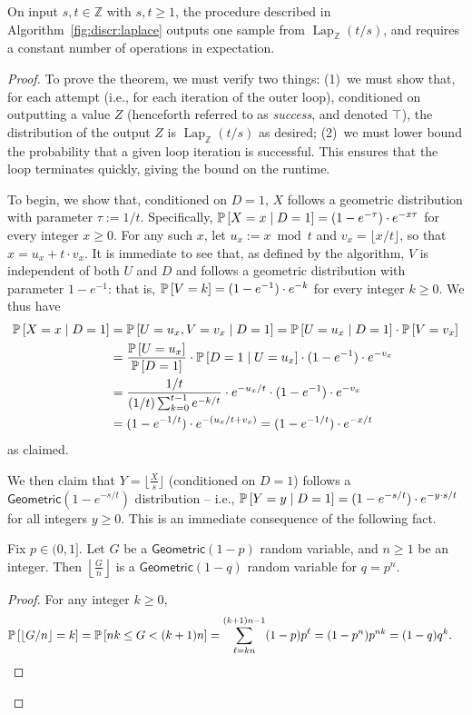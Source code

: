\documentclass{jpcfinal} %
\newcommand{\discL}{\operatorname{Lap}_{\Z}} \newcommand{\discN}{\mathcal{N}_{\Z}}
\newcommand{\pr}[2]{{\ifx&#1& \mathbb{P} \else
\underset{#1}{\mathbb{P}} \fi \left[#2\right]}}
\newcommand{\eqdef}{:=}
\newcommand{\Z}{\mathbb{Z}}
\begin{document}
\begin{prop}
  \label{prop:sampling:discr:laplace}
  On input $s,t \in \Z$ with $s,t\ge1$, the procedure described in Algorithm~\ref{fig:discr:laplace} outputs one sample from $\discL(t/s)$, and requires a constant number of operations in expectation.
\end{prop}
\begin{proof}
To prove the theorem, we must verify two things: (1)~we must show that, for each attempt (i.e., for each iteration of the outer loop), conditioned on outputting a value $Z$ (henceforth referred to as \emph{success}, and denoted $\top$), the distribution of the output $Z$ is $\discL(t/s)$ as desired; (2)~we must lower bound the probability that a given loop iteration is successful. This ensures that the loop terminates quickly, giving the bound on the runtime.

To begin, we show that, conditioned on $D=1$, $X$ follows a geometric distribution with parameter $\tau\eqdef 1/t$. Specifically, $\pr{}{X=x \mid D=1}=(1-e^{-\tau}) \cdot e^{-x\tau}$ for every integer $x\geq 0$. For any such $x$, let $u_x \eqdef x\bmod t$ and $v_x = \lfloor x/t\rfloor$, so that $x=u_x + t\cdot v_x$. It is immediate to see that, as defined by the algorithm, $V$ is independent of both $U$ and $D$ and follows a geometric distribution with parameter $1-e^{-1}$: that is, $\pr{}{V=k} = (1-e^{-1}) \cdot e^{-k}$ for every integer $k\geq 0$. We thus have
\begin{align*}
  \pr{}{X=x \mid D=1} 
  &= \pr{}{ U = u_x, V = v_x \mid D=1}
  = \pr{}{ U = u_x \mid D=1 }\cdot\pr{}{ V = v_x }\\
  &= \frac{ \pr{}{U= u_x} }{\pr{}{D=1}}\cdot\pr{}{ D=1 \mid U=u_x } \cdot (1-e^{-1}) \cdot e^{-v_x} \\
  &= \frac{1/t}{(1/t)\sum_{k=0}^{t-1} e^{-k/t}}\cdot e^{- u_x/t}\cdot(1-e^{-1}) \cdot e^{-v_x} \\
  &= (1-e^{-1/t})\cdot e^{-(u_x/t+v_x)} 
  = (1-e^{-1/t})\cdot e^{-x/t} 
\end{align*}
as claimed.

We then claim that $Y = \lfloor\frac{X}{s}\rfloor$ (conditioned on $D=1$) follows a $\mathsf{Geometric}(1-e^{-s/t})$ distribution -- i.e., $\pr{}{Y=y \mid D=1} = (1-e^{-s/t}) \cdot e^{-y \cdot s/t}$ for all integers $y \ge 0$. This is an immediate consequence of the following fact.
\begin{fact}
Fix $p\in(0,1]$. Let $G$ be a $\mathsf{Geometric}(1-p)$ random variable, and $n\geq 1$ be an integer. Then $\left\lfloor\frac{G}{n}\right\rfloor$ is a $\mathsf{Geometric}(1-q)$ random variable for $q=p^n$.
\end{fact}
\begin{proof}
    For any integer $k\geq 0$, 
    \begin{align*}
        \pr{}{ \lfloor G/n\rfloor = k } 
        &= \pr{}{ nk \leq G < (k+1)n } 
        = \sum_{\ell=kn}^{(k+1)n-1} (1-p)p^\ell 
        = (1-p^n)p^{nk} = (1-q)q^k.
    \end{align*}
\end{proof}


\end{proof}
\end{document}
